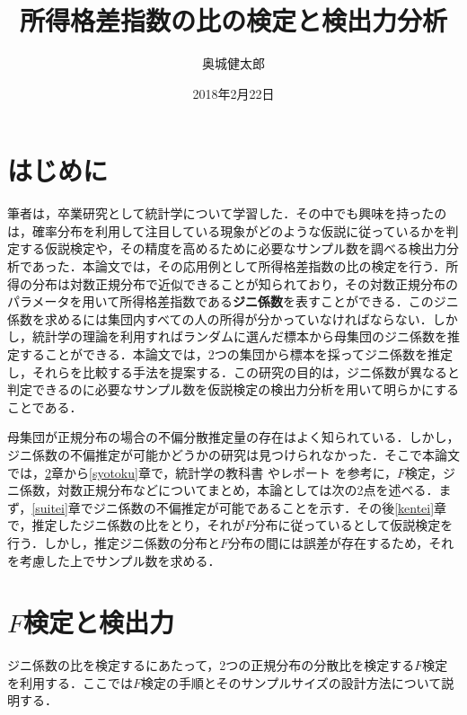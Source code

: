 \documentclass{jsarticle}
\begin{document}
\title{所得格差指数の比の検定と検出力分析}
\author{奥城健太郎}
\date{2018年2月22日}
\maketitle
\thispagestyle{empty}

\newpage
\tableofcontents



\newpage
\section{はじめに}
筆者は，卒業研究として統計学について学習した．その中でも興味を持ったのは，確率分布を利用して注目している現象がどのような仮説に従っているかを判定する仮説検定や，その精度を高めるために必要なサンプル数を調べる検出力分析であった．本論文では，その応用例として所得格差指数の比の検定を行う．所得の分布は対数正規分布で近似できることが知られており，その対数正規分布のパラメータを用いて所得格差指数である\textbf{ジニ係数}を表すことができる．このジニ係数を求めるには集団内すべての人の所得が分かっていなければならない．しかし，統計学の理論を利用すればランダムに選んだ標本から母集団のジニ係数を推定することができる．本論文では，2つの集団から標本を採ってジニ係数を推定し，それらを比較する手法を提案する．この研究の目的は，ジニ係数が異なると判定できるのに必要なサンプル数を仮説検定の検出力分析を用いて明らかにすることである．

母集団が正規分布の場合の不偏分散推定量の存在はよく知られている．しかし，ジニ係数の不偏推定が可能かどうかの研究は見つけられなかった．そこで本論文では，\ref{test,power}章から\ref{syotoku}章で，統計学の教科書\cite{stat,size} やレポート\cite{geho,yosida} を参考に，$F$検定，ジニ係数，対数正規分布などについてまとめ，本論としては次の2点を述べる．まず，\ref{suitei}章でジニ係数の不偏推定が可能であることを示す．その後\ref{kentei}章で，推定したジニ係数の比をとり，それが$F$分布に従っているとして仮説検定を行う．しかし，推定ジニ係数の分布と$F$分布の間には誤差が存在するため，それを考慮した上でサンプル数を求める．


\section{$F$検定と検出力}\label{test,power}
ジニ係数の比を検定するにあたって，2つの正規分布の分散比を検定する$F$検定を利用する．ここでは$F$検定の手順とそのサンプルサイズの設計方法について説明する．
\end{document}
